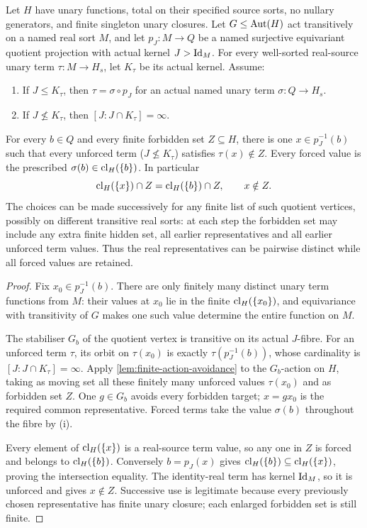 \begin{lemma}
\label{lem:foundational-quotient-fibre-avoidance}
Let $H$ have unary functions, total on their specified source sorts,
no nullary generators, and finite singleton unary closures. Let
$G\le\operatorname{Aut}(H)$ act transitively on a named real sort $M$, and let
$p_J:M\to Q$ be a named surjective equivariant quotient projection
with actual kernel $J>\mathrm{Id}_M$. For every well-sorted real-source unary
term $\tau:M\to H_s$, let $K_\tau$ be its actual kernel. Assume:
\begin{enumerate}[label=(\roman*)]
\item If $J\le K_\tau$, then $\tau=\sigma\circ p_J$ for an actual
  named unary term $\sigma:Q\to H_s$.
\item If $J\nleq K_\tau$, then $[J:J\cap K_\tau]=\infty$.
\end{enumerate}
For every $b\in Q$ and every finite forbidden set $Z\subseteq H$,
there is one $x\in p_J^{-1}(b)$ such that every unforced term
($J\nleq K_\tau$) satisfies $\tau(x)\notin Z$. Every forced value
is the prescribed $\sigma(b)\in\operatorname{cl}_H(\{b\})$. In particular
\[
             \operatorname{cl}_H(\{x\})\cap Z=\operatorname{cl}_H(\{b\})\cap Z,
             \qquad x\notin Z.
\]
The choices can be made successively for any finite list of such
quotient vertices, possibly on different transitive real sorts: at each
step the forbidden set may include any extra finite hidden set, all
earlier representatives and all earlier unforced term values. Thus the
real representatives can be pairwise distinct while all forced values
are retained.
\end{lemma}
\begin{proof}
Fix $x_0\in p_J^{-1}(b)$. There are only finitely many distinct unary
term functions from $M$: their values at $x_0$ lie in the finite
$\operatorname{cl}_H(\{x_0\})$, and equivariance with transitivity of $G$ makes
one such value determine the entire function on $M$.

The stabiliser $G_b$ of the quotient vertex is transitive on its actual
$J$-fibre. For an unforced term $\tau$, its orbit on $\tau(x_0)$ is
exactly $\tau(p_J^{-1}(b))$, whose cardinality is
$[J:J\cap K_\tau]=\infty$. Apply
\cref{lem:finite-action-avoidance} to the $G_b$-action on $H$, taking
as moving set all these finitely many unforced values $\tau(x_0)$ and
as forbidden set $Z$. One $g\in G_b$ avoids every forbidden target;
$x=gx_0$ is the required common representative. Forced terms take the
value $\sigma(b)$ throughout the fibre by (i).

Every element of $\operatorname{cl}_H(\{x\})$ is a real-source term value, so any
one in $Z$ is forced and belongs to $\operatorname{cl}_H(\{b\})$. Conversely
$b=p_J(x)$ gives $\operatorname{cl}_H(\{b\})\subseteq\operatorname{cl}_H(\{x\})$, proving the
intersection equality. The identity-real term has kernel $\mathrm{Id}_M$,
so it is unforced and gives $x\notin Z$. Successive use is legitimate
because every previously chosen representative has finite unary
closure; each enlarged forbidden set is still finite.
\end{proof}

